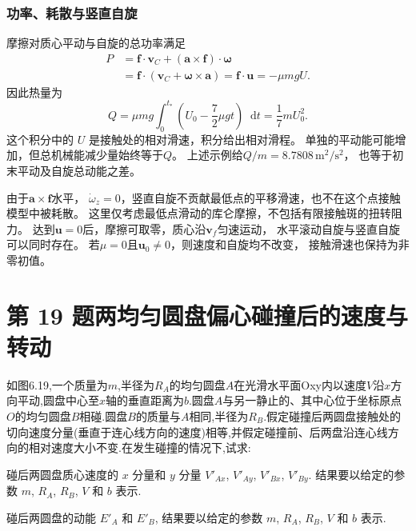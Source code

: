 \documentclass[UTF8,fontset=fandol,a4paper,11pt]{ctexart}
\newcommand{\dd}{\mathop{}\!\mathrm{d}}
\newcommand{\tagline}[1]{\noindent{\small\color{muted}#1}\par}
\begin{document}
\subsubsection*{功率、耗散与竖直自旋}
摩擦对质心平动与自旋的总功率满足
\[
\begin{aligned}
P&=\boldsymbol f\cdot\boldsymbol v_C
+(\boldsymbol a\times\boldsymbol f)\cdot\boldsymbol\omega\\
&=\boldsymbol f\cdot(\boldsymbol v_C+\boldsymbol\omega\times\boldsymbol a)
=\boldsymbol f\cdot\boldsymbol u=-\mu mg U.
\end{aligned}
\]
因此热量为
\[
Q=\mu mg\int_0^{t_*}\left(U_0-\frac72\mu gt\right)\dd t
=\frac17mU_0^2.
\]
这个积分中的 $U$ 是接触处的相对滑速，积分给出相对滑程。
单独的平动能可能增加，但总机械能减少量始终等于$Q$。
上述示例给$Q/m=8.7808\,\mathrm{m^2/s^2}$，
也等于初末平动及自旋总动能之差。

由于$\boldsymbol a\times\boldsymbol f$水平，
$\dot\omega_z=0$，竖直自旋不贡献最低点的平移滑速，也不在这个点接触模型中被耗散。
这里仅考虑最低点滑动的库仑摩擦，不包括有限接触斑的扭转阻力。
达到$\boldsymbol u=0$后，摩擦可取零，质心沿$\boldsymbol v_f$匀速运动，
水平滚动自旋与竖直自旋可以同时存在。
若$\mu=0$且$\boldsymbol u_0\ne0$，则速度和自旋均不改变，
接触滑速也保持为非零初值。




\section*{第 19 题\quad 两均匀圆盘偏心碰撞后的速度与转动}

\tagline{M-06-19}

如图6.19,一个质量为\(m\),半径为\(R_A\)的均匀圆盘\(A\)在光滑水平面Oxy内以速度\(V\)沿\(x\)方向平动,圆盘中心至\(x\)轴的垂直距离为\(b\).圆盘\(A\)与另一静止的、其中心位于坐标原点\(O\)的均匀圆盘\(B\)相碰.圆盘\(B\)的质量与\(A\)相同,半径为\(R_B\).假定碰撞后两圆盘接触处的切向速度分量(垂直于连心线方向的速度)相等,并假定碰撞前、后两盘沿连心线方向的相对速度大小不变.在发生碰撞的情况下,试求:

碰后两圆盘质心速度的 \(x\) 分量和 \(y\) 分量 \(V'_{Ax}\), \(V'_{Ay}\),
\(V'_{Bx}\), \(V'_{By}\). 结果要以给定的参数 \(m\), \(R_A\), \(R_B\),
\(V\) 和 \(b\) 表示.

碰后两圆盘的动能 \(E'_A\) 和 \(E'_B\), 结果要以给定的参数 \(m\),
\(R_A\), \(R_B\), \(V\) 和 \(b\) 表示.
\end{document}
